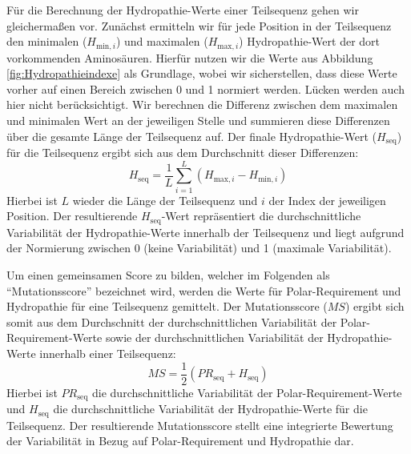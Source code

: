 \documentclass[german,version-2022-01]{uzl-thesis}
\begin{document}
F\"ur die Berechnung der Hydropathie-Werte einer Teilsequenz gehen wir gleicherma\ss{}en vor. Zun\"achst ermitteln wir f\"ur jede Position in der Teilsequenz den minimalen ($H_{\text{min},i}$) und maximalen ($H_{\text{max},i}$) Hydropathie-Wert der dort vorkommenden Aminos\"auren. Hierf\"ur nutzen wir die Werte aus Abbildung \ref{fig:Hydropathieindexe} als Grundlage, wobei wir sicherstellen, dass diese Werte vorher auf einen Bereich zwischen 0 und 1 normiert werden. L\"ucken werden auch hier nicht ber\"ucksichtigt. Wir berechnen die Differenz zwischen dem maximalen und minimalen Wert an der jeweiligen Stelle und summieren diese Differenzen \"uber die gesamte L\"ange der Teilsequenz auf. Der finale Hydropathie-Wert ($H_{\text{seq}}$) f\"ur die Teilsequenz ergibt sich aus dem Durchschnitt dieser Differenzen:
\begin{equation}
    H_{\text{seq}} = \frac{1}{L} \sum_{i=1}^{L} (H_{\text{max},i} - H_{\text{min},i})
    \label{eq:hydropathie}
\end{equation} 
Hierbei ist $L$ wieder die L\"ange der Teilsequenz und $i$ der Index der jeweiligen Position. Der resultierende $H_{\text{seq}}$-Wert repr\"asentiert die durchschnittliche Variabilit\"at der Hydropathie-Werte innerhalb der Teilsequenz und liegt aufgrund der Normierung zwischen 0 (keine Variabilit\"at) und 1 (maximale Variabilit\"at).

Um einen gemeinsamen Score zu bilden, welcher im Folgenden als "`Mutationsscore"' bezeichnet wird, werden die Werte f\"ur Polar-Requirement und Hydropathie f\"ur eine Teilsequenz gemittelt. Der Mutationsscore ($MS$) ergibt sich somit aus dem Durchschnitt der durchschnittlichen Variabilit\"at der Polar-Requirement-Werte sowie der durchschnittlichen Variabilit\"at der Hydropathie-Werte innerhalb einer Teilsequenz: 
\begin{equation}
    MS = \frac{1}{2} \left( PR_{\text{seq}} + H_{\text{seq}} \right)
    \label{eq:mutationsscore}
\end{equation}
Hierbei ist $PR_{\text{seq}}$ die durchschnittliche Variabilit\"at der Polar-Requirement-Werte und $H_{\text{seq}}$ die durchschnittliche Variabilit\"at der Hydropathie-Werte f\"ur die Teilsequenz. Der resultierende Mutationsscore stellt eine integrierte Bewertung der Variabilit\"at in Bezug auf Polar-Requirement und Hydropathie dar.
\end{document}
